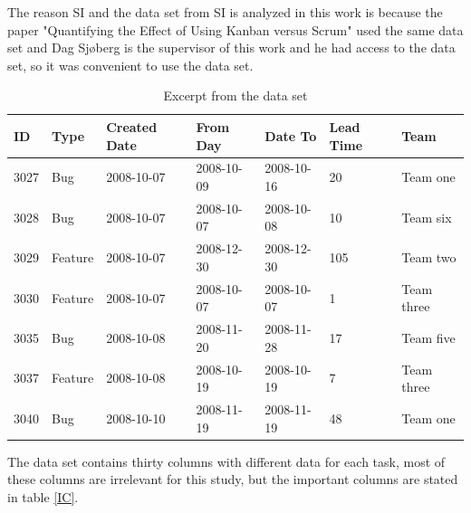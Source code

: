 \documentclass[UKenglish]{ifimaster}  %
\begin{document}
The reason SI and the data set from SI is analyzed in this work is because the paper "Quantifying the Effect of Using Kanban versus Scrum" \parencite{Dag} used the same data set and Dag Sj\o berg is the supervisor of this work and he had access to the data set, so it was convenient to use the data set.

\begin{table}[!ht]
\begin{center}
\begin{tabular}{|l|l|l|l|l|l|l|}
\hline
ID	& Type &  Created Date & From Day & Date To & Lead Time & Team \\ \hline
    3027 & Bug & 2008-10-07 &  2008-10-09 & 2008-10-16 & 20 & Team one\\ \hline
   3028 & Bug  & 2008-10-07 & 2008-10-07 & 2008-10-08 & 10 & Team six\\ \hline
   3029 & Feature & 2008-10-07 &  2008-12-30	 & 2008-12-30 & 105 & Team two\\ \hline
    3030 & Feature & 2008-10-07 & 2008-10-07	& 2008-10-07 & 1& Team three\\ \hline
   3035 & Bug & 2008-10-08 & 2008-11-20 & 2008-11-28 & 17 & Team five\\ \hline
   3037 & Feature & 2008-10-08 &  2008-10-19	 & 2008-10-19 & 7 & Team three\\ \hline
   3040 & Bug & 2008-10-10 &  2008-11-19 & 2008-11-19 & 48 & Team one\\ \hline
   \end{tabular}
\caption{Excerpt from the data set}
\label{dataset}
\end{center}
\end{table}

The data set contains thirty columns with different data for each task, most of these columns are irrelevant for this study, but the important columns are stated in table \ref{IC}.
\end{document}
